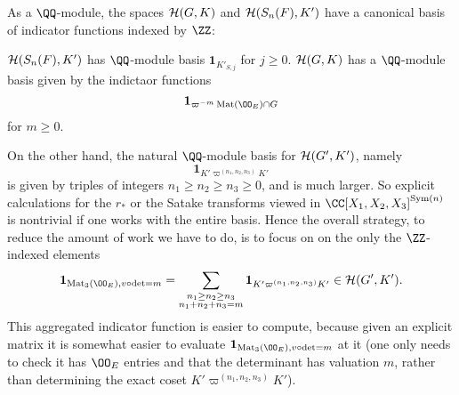 As a $\QQ$-module, the spaces $\mathcal H(G,K)$ and $\mathcal H(S_n(F), K')$
have a canonical basis of indicator functions indexed by $\ZZ$:
\begin{itemize}
  \ii $\mathcal H(S_n(F), K')$ has $\QQ$-module basis $\mathbf{1}_{K'_{S,j}}$ for $j \ge 0$.
  \ii $\mathcal H(G,K)$ has a $\QQ$-module basis given by the indictaor functions
  \[ \mathbf{1}_{\varpi^{-m} \Mat(\OO_E) \cap G} \]
  for $m \ge 0$.
\end{itemize}
On the other hand, the natural $\QQ$-module basis for $\mathcal H(G', K')$, namely
\[ \mathbf{1}_{K'\varpi^{(n_1, n_2, n_3)}K'} \]
is given by triples of integers $n_1 \ge n_2 \ge n_3 \ge 0$, and is much larger.
So explicit calculations for the $r_\ast$ or the Satake transforms viewed in
$\CC[X_1, X_2, X_3]^{\Sym(n)}$ is nontrivial if one works with the entire basis.
Hence the overall strategy, to reduce the amount of work we have to do,
is to focus on on the only the $\ZZ$-indexed elements
\[
  \mathbf{1}_{\Mat_3(\OO_E), v\circ\det=m}
  = \sum_{\substack{n_1 \ge n_2 \ge n_3 \\ n_1 + n_2 + n_3 = m}}
  \mathbf{1}_{K'\varpi^{(n_1, n_2, n_3)}K'} \in \HH(G', K').
\]
This aggregated indicator function is easier to compute,
because given an explicit matrix it is somewhat easier
to evaluate $\mathbf{1}_{\Mat_3(\OO_E), v\circ\det=m}$
at it (one only needs to check it has $\OO_E$ entries
and that the determinant has valuation $m$,
rather than determining the exact coset $K'\varpi^{(n_1, n_2, n_3)}K'$).

